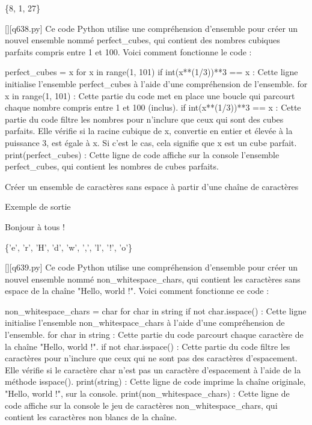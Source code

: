 \{8, 1, 27\}
        \par
        \begin{solution}
            \renewcommand{\nomfichier}{q638.py}
            \pythonfile{\chemincode \nomfichier}[][\nomfichier]
            Ce code Python utilise une compréhension d'ensemble pour créer un nouvel ensemble nommé perfect_cubes, qui contient des nombres cubiques parfaits compris entre 1 et 100. Voici comment fonctionne le code :

    perfect_cubes = {x for x in range(1, 101) if int(x**(1/3))**3 == x} : Cette ligne initialise l'ensemble perfect_cubes à l'aide d'une compréhension de l'ensemble.
        for x in range(1, 101) : Cette partie du code met en place une boucle qui parcourt chaque nombre compris entre 1 et 100 (inclus).
        if int(x**(1/3))**3 == x : Cette partie du code filtre les nombres pour n'inclure que ceux qui sont des cubes parfaits. Elle vérifie si la racine cubique de x, convertie en entier et élevée à la puissance 3, est égale à x. Si c'est le cas, cela signifie que x est un cube parfait.
    print(perfect_cubes) : Cette ligne de code affiche sur la console l'ensemble perfect_cubes, qui contient les nombres de cubes parfaits.
        \end{solution}
        

        \question
        Créer un ensemble de caractères sans espace à partir d'une chaîne de caractères

Exemple de sortie

Bonjour à tous !

\{'e', 'r', 'H', 'd', 'w', ',', 'l', '!', 'o'\}
        \par
        \begin{solution}
            \renewcommand{\nomfichier}{q639.py}
            \pythonfile{\chemincode \nomfichier}[][\nomfichier]
            Ce code Python utilise une compréhension d'ensemble pour créer un nouvel ensemble nommé non_whitespace_chars, qui contient les caractères sans espace de la chaîne "Hello, world !". Voici comment fonctionne ce code :

    non_whitespace_chars = {char for char in string if not char.isspace()} : Cette ligne initialise l'ensemble non_whitespace_chars à l'aide d'une compréhension de l'ensemble.
        for char in string : Cette partie du code parcourt chaque caractère de la chaîne "Hello, world !".
        if not char.isspace() : Cette partie du code filtre les caractères pour n'inclure que ceux qui ne sont pas des caractères d'espacement. Elle vérifie si le caractère char n'est pas un caractère d'espacement à l'aide de la méthode isspace().
    print(string) : Cette ligne de code imprime la chaîne originale, "Hello, world !", sur la console.
    print(non_whitespace_chars) : Cette ligne de code affiche sur la console le jeu de caractères non_whitespace_chars, qui contient les caractères non blancs de la chaîne.
        \end{solution}
        

